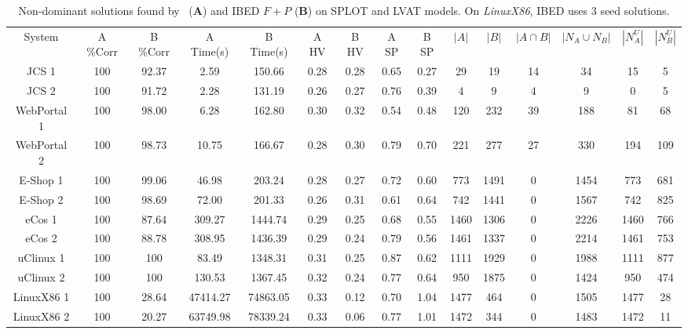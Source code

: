 \begin{table*}[htbp]
  \centering
    \vspace{-3mm}
  \scriptsize
   \caption{Non-dominant solutions found by \ourSol~(\textbf{A}) and  IBED $F+P$ (\textbf{B}) on SPLOT and LVAT models. On \emph{LinuxX86}, IBED uses 3 seed solutions.}
    \begin{tabular}{|c|c|c|c|c|c|c|c|c|c|c|c|c|c|c|}
  \Xhline{2\arrayrulewidth}
    System & A \%Corr & B \%Corr & A Time(s) & B Time(s) &A HV & B HV & A SP & B SP & $|A|$ & $|B|$ & $|A \cap B|$ & \textbf{$|N_A \cup N_B|$} & \textbf{$|N^{U}_A|$} & \textbf{$|N^{U}_B|$} \bigstrut\\
   \Xhline{2\arrayrulewidth}
    JCS 1  & 100   & 92.37  & 2.59  & 150.66  & 0.28  & 0.28  & 0.65  & 0.27  & 29    & 19    & 14    & 34    & 15    & 5 \bigstrut\\
    \hline
    JCS 2  & 100   & 91.72  & 2.28  & 131.19  & 0.26  & 0.27  & 0.76  & 0.39  & 4     & 9     & 4     & 9     & 0     & 5 \bigstrut\\
    \hline
    WebPortal 1 & 100   & 98.00  & 6.28  & 162.80  & 0.30  & 0.32  & 0.54  & 0.48  & 120   & 232   & 39    & 188   & 81    & 68 \bigstrut\\
    \hline
    WebPortal 2 & 100   & 98.73  & 10.75  & 166.67  & 0.28  & 0.30  & 0.79  & 0.70  & 221   & 277   & 27    & 330   & 194   & 109 \bigstrut\\
    \hline
    E-Shop 1 & 100   & 99.06  & 46.98  & 203.24  & 0.28  & 0.27  & 0.72  & 0.60  & 773   & 1491  & 0     & 1454  & 773   & 681 \bigstrut\\
    \hline
    E-Shop 2 & 100   & 98.69  & 72.00  & 201.33  & 0.26  & 0.31  & 0.61  & 0.64  & 742   & 1441  & 0     & 1567  & 742   & 825  
    \bigstrut\\
    \hline
    eCos 1 & 100   & 87.64  & 309.27  & 1444.74  & 0.29  & 0.25  & 0.68  & 0.55  & 1460  & 1306  & 0     & 2226  & 1460  & 766 \bigstrut\\
    \hline
    eCos 2 & 100   & 88.78  & 308.95  & 1436.39  & 0.29  & 0.24  & 0.79  & 0.56  & 1461  & 1337  & 0     & 2214  & 1461  & 753 \bigstrut\\
    \hline
    uClinux 1 & 100   & 100   & 83.49  & 1348.31  & 0.31  & 0.25  & 0.87  & 0.62  & 1111  & 1929  & 0     & 1988  & 1111  & 877 \bigstrut\\
    \hline
    uClinux 2 & 100   & 100   & 130.53  & 1367.45  & 0.32  & 0.24  & 0.77  & 0.64  & 950   & 1875  & 0     & 1424  & 950   & 474 \bigstrut\\
    \hline
     LinuxX86 1 & 100   & 28.64 & 47414.27 & 74863.05 & 0.33  & 0.12  & 0.70  & 1.04  & 1477  & 464   & 0     & 1505  & 1477  & 28 \bigstrut\\
    \hline
    LinuxX86 2 & 100   & 20.27 & 63749.98 & 78339.24 & 0.33  & 0.06  & 0.77  & 1.01  & 1472  & 344   & 0     & 1483  & 1472  & 11 \bigstrut\\
    \hline

    \end{tabular}%
  \label{tab:ourSolVSibed}%
\vspace{-3mm}
\end{table*}%

